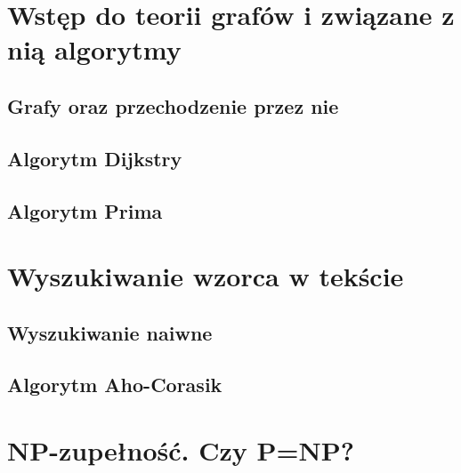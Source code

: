 \documentclass[10pt, oneside]{article}
\theoremstyle{remark}
\begin{document}
\section{Wstęp do teorii grafów i związane z nią algorytmy}
\subsection{Grafy oraz przechodzenie przez nie}
\subsection{Algorytm Dijkstry}
\subsection{Algorytm Prima}

\section{Wyszukiwanie wzorca w tekście}

\subsection{Wyszukiwanie naiwne}

\subsection{Algorytm Aho-Corasik}

\section{NP-zupełność. Czy P=NP?}
\end{document}
